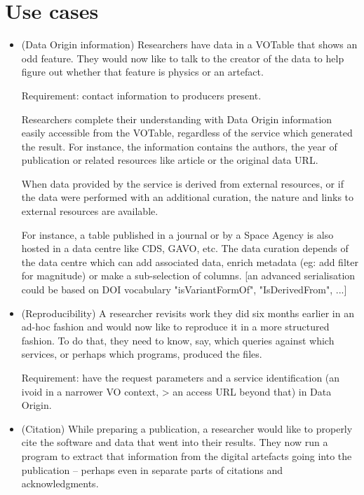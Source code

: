 \documentclass[11pt,a4paper]{ivoa}
\begin{document}
\section{Use cases}

\begin{itemize}
	\item (Data Origin information) Researchers have data in a VOTable that shows an odd feature. They would now like to talk to the creator of the data to help figure out whether that feature is physics or an artefact.
	
	Requirement: contact information to producers present.
	
	Researchers complete their understanding with Data Origin information easily accessible from the VOTable, regardless of the service which generated the result. For instance, the information contains the authors, the year of publication or related resources like article or the original data URL.
		
	When data provided by the service is derived from external resources, or if the data were performed with an additional curation, the nature and links to external resources are available.
	
	For instance, a table published in a journal or by a Space Agency is also hosted in a data centre like CDS, GAVO, etc. The data curation depends of the data centre which can add associated data, enrich metadata (eg: add filter for magnitude) or make a sub-selection of columns. [an advanced serialisation could be based on DOI vocabulary "isVariantFormOf", "IsDerivedFrom", ...]
	
	\item (Reproducibility) A researcher revisits work they did six months earlier in an ad-hoc fashion and would now like to reproduce it in a more structured fashion. To do that, they need to know, say, which queries against which services, or perhaps which programs, produced the files.
	
	Requirement: have the request parameters and a service identification
	(an ivoid in a narrower VO context, > an access URL beyond that)
	in Data Origin.
	
	\item (Citation) While preparing a publication, a researcher would like to properly cite the software and data that went into their results. They now run a program to extract that information from the digital artefacts going into the publication -- perhaps even in separate parts of citations and acknowledgments.
	

\end{itemize}
\end{document}

